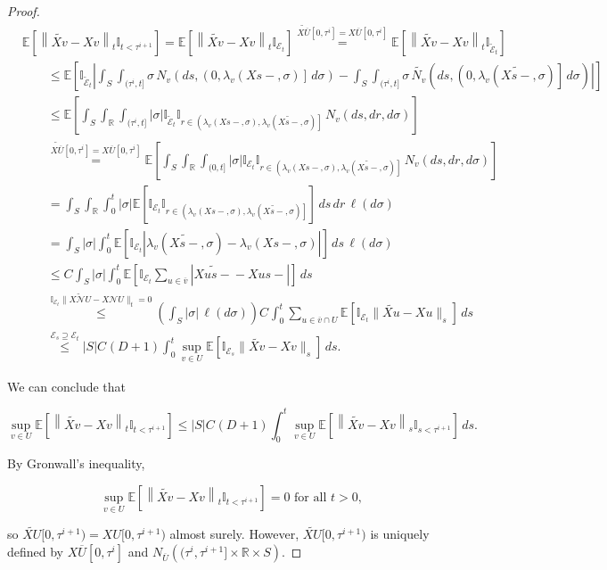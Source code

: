 \documentclass[12pt]{article}
\newcommand{\mb}{\mathbb}
\newcommand{\mc}{\mathcal}
\newcommand{\ov}{\overline}
\newcommand{\os}{\overset}
\newcommand{\te}{\text}
\newcommand{\ind}{\hspace{24pt}}
\newcommand{\ex}[1]{\mb{E}\left[#1\right]}			%
\newcommand{\neigh}{\mc{N}}					%
\renewcommand{\v}{v}							%
\newcommand{\vv}{u}								%
\renewcommand{\U}{U}							%
\renewcommand{\S}{S}							%
\newcommand{\s}{\sigma}							%
\renewcommand{\t}{t}							%
\renewcommand{\tt}{s}							%
\newcommand{\X}{X}								%
\newcommand{\cl}{\ov}							%
\newcommand{\degr}{D}								%
\newcommand{\poiss}[1]{N_{#1}}						%
\renewcommand{\r}{r}								%
\newcommand{\rt}[1]{\tau^{#1}}						%
\newcommand{\itt}{i}								%
\newcommand{\rate}[1]{\lambda_{#1}}					%
\newcommand{\const}[1]{C_{#1}}						%
\newcommand{\Sm}{\ell}								%
\newcommand{\alt}{\widetilde}						%
\newcommand{\evnt}{\mc{E}}						%
\begin{document}
\begin{proof}
\begin{align*}
&\ex{\left\|\alt{\X{\v}{}} - \X{\v}{}\right\|_{\t}\mb{I}_{\t < \rt{\itt+1}}} = \ex{\left\|\alt{\X{\v}{}} - \X{\v}{}\right\|_{\t}\mb{I}_{\evnt_\t}}\os{\alt{\X{\cl{\U}}{}}[0,\rt{\itt}] = \X{\cl{\U}}{[0,\rt{\itt}]}}{=} \ex{\left\|\alt{\X{\v}{}} - \X{\v}{}\right\|_{\t}\mb{I}_{\alt{\evnt}_\t}}\\
&\ind\leq \ex{\mb{I}_{\alt{\evnt}_\t}\left|\int_\S\int_{(\rt{\itt},t]} \s\,\poiss{\v}\left(d\tt,\left(0,\rate{\v}(\X{}{\tt-},\s)\right]\,d\s\right) - \int_\S\int_{(\rt{\itt},\t]} \s\,\alt{\poiss{\v}}\left(d\tt,\left(0,\rate{\v}(\alt{\X{}{\tt-}},\s)\right]\,d\s\right)\right|}\\
&\ind \leq \ex{\int_\S\int_{\mb{R}}\int_{(\rt{\itt},\t]}|\s|\mb{I}_{\alt{\evnt}_\t}\mb{I}_{\r\in \left(\rate{\v}(\X{}{\tt-},\s), \rate{\v}(\alt{\X{}{\tt-}},\s)\right]}\,\poiss{\v}\left(d\tt,d\r,d\s\right)}\\
&\ind \os{\alt{\X{\cl{\U}}{}}[0,\rt{\itt}] = \X{\cl{\U}}{[0,\rt{\itt}]}}{=} \ex{\int_\S\int_{\mb{R}}\int_{(0,\t]}|\s|\mb{I}_{\evnt_\t}\mb{I}_{\r\in \left(\rate{\v}(\X{}{\tt-},\s), \rate{\v}(\alt{\X{}{\tt-}},\s)\right]}\,\poiss{\v}\left(d\tt,d\r,d\s\right)}\\
&\ind = \int_\S\int_\mb{R}\int_0^\t |\s|\ex{\mb{I}_{\evnt_\t}\mb{I}_{\r\in\left(\rate{\v}(\X{}{\tt-},\s),\rate{\v}(\alt{\X{}{\tt-}},\s)\right]}}\,d\tt\,d\r\,\Sm(d\s)\\
&\ind = \int_\S |\s|\int_0^\t \ex{\mb{I}_{\evnt_t}\left|\rate{\v}(\alt{\X{}{\tt-}},\s) - \rate{\v}(\X{}{\tt-},\s)\right|}\,d\tt\,\Sm(d\s)\\
&\ind \leq \const{}\int_\S|\s|\int_0^\t\ex{\mb{I}_{\evnt_t}\sum_{\vv\in \cl{\v}}\left|\alt{\X{\vv}{\tt-}} - \X{\vv}{\tt-}\right|}\,d\tt\\
&\ind \os{\mb{I}_{\evnt_\t}\|\alt{\X{\neigh{\U}}{}} - \X{\neigh{\U}}{}\|_t = 0}{\leq} \left(\int_\S|\s|\,\Sm(d\s)\right)\const{} \int_0^\t \sum_{\vv\in \cl{\v}\cap\U}\ex{\mb{I}_{\evnt_t}\|\alt{\X{\vv}{}} - \X{\vv}{}\|_\tt}\,d\tt\\
&\ind \os{\evnt_\tt \supseteq \evnt_\t}{\leq} |S|\const{}(\degr+1) \int_0^\t \sup_{\v\in \U}\ex{\mb{I}_{\evnt_\tt}\|\alt{\X{\v}{}} - \X{\v}{}\|_\tt}\,d\tt.
\end{align*}

We can conclude that

\[\sup_{\v\in \U}\ex{\left\|\alt{\X{\v}{}} - \X{\v}{}\right\|_{\t}\mb{I}_{t <\rt{\itt+1}}} \leq |\S|\const{}(\degr+1)\int_0^\t\sup_{v\in\U}\ex{\left\|\alt{\X{\v}{}} - \X{\v}{}\right\|_\tt\mb{I}_{\tt < \rt{\itt+1}}}\,d\tt.\]

By Gronwall's inequality,

\[\sup_{v\in \U}\ex{\left\|\alt{\X{\v}{}} - \X{\v}{}\right\|_\t\mb{I}_{\t < \rt{\itt+1}}} = 0 \te{ for all } \t > 0,\]

so \(\alt{\X{\U}{}}[0,\rt{\itt+1}) = \X{\U}{[0,\rt{\itt+1})}\) almost surely. However, \(\alt{\X{\U}{}}[0,\rt{\itt+1})\) is uniquely defined by \(\X{\cl{\U}}{[0,\rt{\itt}]}\) and \(\poiss{\cl{\U}}\left((\rt{\itt},\rt{\itt+1}]\times \mb{R}\times \S\right)\).
\end{proof}
\end{document}
